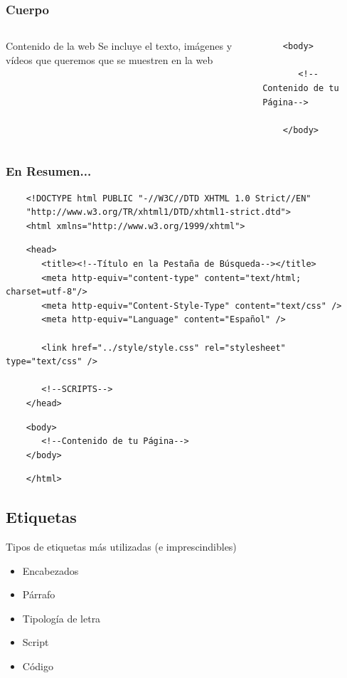 \documentclass{beamer}
\begin{document}
\begin{frame}[fragile] %
\frametitle{Cuerpo}
	\begin{columns}[c]
	\begin{block}{Contenido de la web}
	Se incluye el texto, imágenes y vídeos que queremos que se muestren en la web
	\end{block}
	
	\scriptsize{
	\begin{verbatim}
	<body>
	
	   <!--Contenido de tu Página-->
	   
	</body>
	\end{verbatim}
	}
	\end{columns}
\end{frame}

\begin{frame}[fragile] %
\frametitle{En Resumen...}
	\scriptsize{
	\begin{verbatim}
	<!DOCTYPE html PUBLIC "-//W3C//DTD XHTML 1.0 Strict//EN"
	"http://www.w3.org/TR/xhtml1/DTD/xhtml1-strict.dtd">
	<html xmlns="http://www.w3.org/1999/xhtml">
	\end{verbatim}
	\begin{verbatim}
	<head>
	   <title><!--Título en la Pestaña de Búsqueda--></title>
	   <meta http-equiv="content-type" content="text/html; charset=utf-8"/>
	   <meta http-equiv="Content-Style-Type" content="text/css" />
	   <meta http-equiv="Language" content="Español" />

	   <link href="../style/style.css" rel="stylesheet" type="text/css" />
	
	   <!--SCRIPTS-->
	</head>
	\end{verbatim}
	\begin{verbatim}
	<body>
	   <!--Contenido de tu Página-->
	</body>
	\end{verbatim}
	\begin{verbatim}
	</html>	
	\end{verbatim}	
	}
\end{frame}

	\subsection{Etiquetas}
\begin{frame}
	\begin{block}{Tipos de etiquetas más utilizadas (e imprescindibles)}
		\begin{itemize}
		\item Encabezados
		\item Párrafo
		\item Tipología de letra
		\item Script
		\item Código
		\end{itemize}
	\end{block}
\end{frame}
\end{document}
